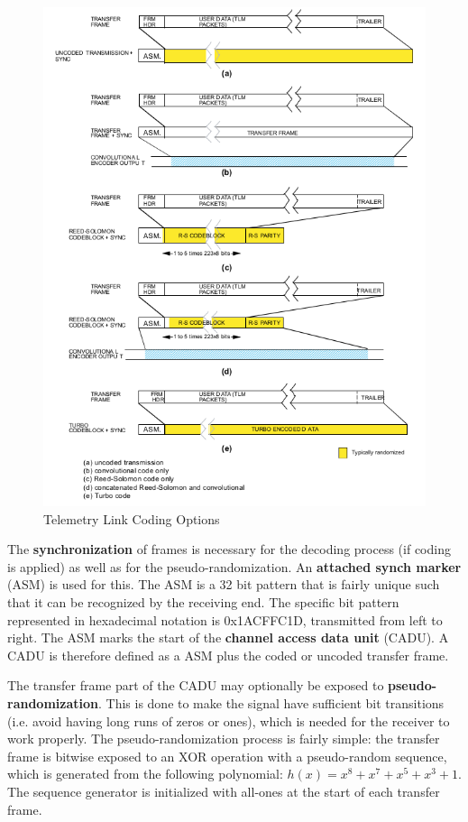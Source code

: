 \begin{figure}[h]
\centering\includegraphics[scale=0.5]{fig/telemetry_link_coding_options}
\caption{Telemetry Link Coding Options}
\label{fig:Telemetry Link Coding Options}
\end{figure}

The \textbf{synchronization} of frames is necessary for the decoding process (if coding is applied) as well as for the pseudo-randomization. An \textbf{attached synch marker} (ASM) is used for this. The ASM is a 32 bit pattern that is fairly unique such that it can be recognized by the receiving end. The specific bit pattern represented in hexadecimal notation is 0x1ACFFC1D, transmitted from left to right. The ASM marks the start of the \textbf{channel access data unit} (CADU). A CADU is therefore defined as a ASM plus the coded or uncoded transfer frame. 

The transfer frame part of the CADU may optionally be exposed to \textbf{pseudo-randomization}. This is done to make the signal have sufficient bit transitions (i.e. avoid having long runs of zeros or ones), which is needed for the receiver to work properly. The pseudo-randomization process is fairly simple: the transfer frame is bitwise exposed to an XOR operation with a pseudo-random sequence, which is generated from the following polynomial: $h(x) = x^{8} + x^{7} +x^{5} + x^{3} + 1$. The sequence generator is initialized with all-ones at the start of each transfer frame.

